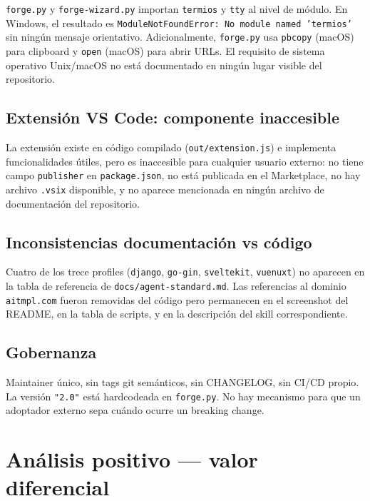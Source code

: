 \documentclass[11pt,a4paper]{article}
\begin{document}
\texttt{forge.py} y \texttt{forge-wizard.py} importan \texttt{termios} y \texttt{tty} al nivel de módulo. En Windows, el resultado es \texttt{ModuleNotFoundError: No module named 'termios'} sin ningún mensaje orientativo. Adicionalmente, \texttt{forge.py} usa \texttt{pbcopy} (macOS) para clipboard y \texttt{open} (macOS) para abrir URLs. El requisito de sistema operativo Unix/macOS no está documentado en ningún lugar visible del repositorio.

\subsection{Extensión VS Code: componente inaccesible}

La extensión existe en código compilado (\texttt{out/extension.js}) e implementa funcionalidades útiles, pero es inaccesible para cualquier usuario externo: no tiene campo \texttt{publisher} en \texttt{package.json}, no está publicada en el Marketplace, no hay archivo \texttt{.vsix} disponible, y no aparece mencionada en ningún archivo de documentación del repositorio.

\subsection{Inconsistencias documentación vs código}

Cuatro de los trece profiles (\texttt{django}, \texttt{go-gin}, \texttt{sveltekit}, \texttt{vuenuxt}) no aparecen en la tabla de referencia de \texttt{docs/agent-standard.md}. Las referencias al dominio \texttt{aitmpl.com} fueron removidas del código pero permanecen en el screenshot del README, en la tabla de scripts, y en la descripción del skill correspondiente.

\subsection{Gobernanza}

Maintainer único, sin tags git semánticos, sin CHANGELOG, sin CI/CD propio. La versión \texttt{"2.0"} está hardcodeada en \texttt{forge.py}. No hay mecanismo para que un adoptador externo sepa cuándo ocurre un breaking change.

\section{Análisis positivo — valor diferencial}
\end{document}
